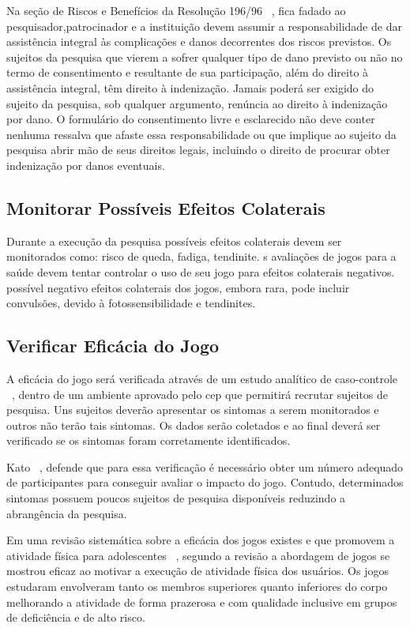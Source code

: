 Na seção de Riscos e Benefícios da Resolução 196/96 ~\cite{conselho2000normas}, fica fadado ao pesquisador,patrocinador e a instituição devem assumir a responsabilidade de dar assistência integral às complicações e danos decorrentes dos riscos previstos. Os sujeitos da pesquisa que vierem a sofrer qualquer tipo de dano previsto ou não no termo de consentimento e resultante de sua participação, além do direito à assistência integral, têm direito à indenização. Jamais poderá ser exigido do sujeito da pesquisa, sob qualquer argumento, renúncia ao direito à indenização por dano. O formulário do consentimento livre e esclarecido não deve conter nenhuma ressalva que afaste essa responsabilidade ou que implique ao sujeito da pesquisa abrir mão de seus direitos legais, incluindo o direito de procurar obter indenização por danos eventuais.

\subsection{Monitorar Possíveis Efeitos Colaterais}
Durante a execução da pesquisa possíveis efeitos colaterais devem ser monitorados como: risco de queda, fadiga, tendinite. 
s avaliações de jogos para a saúde devem tentar controlar o uso de seu jogo para efeitos colaterais negativos. possível negativo efeitos colaterais dos jogos, embora rara, pode incluir convulsões, devido à fotossensibilidade e tendinites.

\subsection{Verificar Eficácia do Jogo}
A eficácia do jogo será verificada através de um estudo analítico de caso-controle ~\cite{menezes2001epidemiologia}, dentro de um ambiente aprovado pelo \ac{cep} que permitirá recrutar sujeitos de pesquisa. Uns sujeitos deverão apresentar os sintomas a serem monitorados e outros não terão tais sintomas. Os dados serão coletados e ao final deverá ser verificado se os sintomas foram corretamente identificados.

Kato ~\cite{kato12}, defende que para essa verificação é necessário obter um número adequado de participantes para conseguir avaliar o impacto do jogo. Contudo, determinados sintomas possuem poucos sujeitos de pesquisa disponíveis reduzindo a abrangência da pesquisa.

Em uma revisão sistemática sobre a eficácia dos jogos existes e que promovem a atividade física para adolescentes ~\cite{foley-active-game2010}, segundo a revisão a abordagem de jogos se mostrou eficaz ao motivar a execução de atividade física dos usuários. Os jogos estudaram envolveram tanto os membros superiores quanto inferiores do corpo melhorando a atividade de forma prazerosa e com qualidade inclusive em grupos de deficiência e de alto risco.

